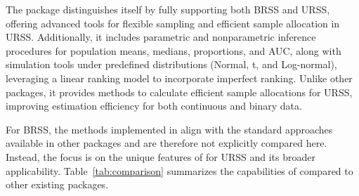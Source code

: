 The  package distinguishes itself by fully supporting both BRSS and URSS, offering advanced tools for flexible sampling and efficient sample allocation in URSS. Additionally, it includes parametric and nonparametric inference procedures for population means, medians, proportions, and AUC, along with simulation tools under predefined distributions (Normal, t, and Log-normal), leveraging a linear ranking model to incorporate imperfect ranking. Unlike other packages, it provides methods to calculate efficient sample allocations for URSS, improving estimation efficiency for both continuous and binary data.

For BRSS, the methods implemented in  align with the standard approaches available in other packages and are therefore not explicitly compared here. Instead, the focus is on the unique features of  for URSS and its broader applicability. Table~\ref{tab:comparison} summarizes the capabilities of  compared to other existing packages.

